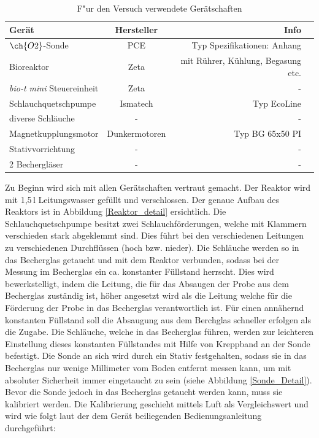 \documentclass[12pt,liststotoc]{report}
\begin{document}
\begin{table}[H]
\caption{F"ur den Versuch verwendete Gerätschaften}
\centering
\begin{tabular}{lcrp{10 cm}}
\toprule 
Gerät&Hersteller&Info\\
\midrule
$\ch{O2}$-Sonde&PCE&Typ Spezifikationen: Anhang\\
Bioreaktor &Zeta&mit Rührer, Kühlung, Begasung etc.\\ 
\textit{bio-t mini} Steuereinheit&Zeta&-\\
Schlauchquetschpumpe&Ismatech&Typ EcoLine\\
diverse Schläuche&-&-\\
Magnetkupplungsmotor&Dunkermotoren&Typ BG 65x50 PI\\
Stativvorrichtung&-&-\\
2 Bechergläser&-&-\\
\bottomrule
\end{tabular}
\label{Geraete}
\end{table}

Zu Beginn wird sich mit allen Gerätschaften vertraut gemacht. Der Reaktor wird mit 1,5\,l Leitungswasser gefüllt und verschlossen. Der genaue Aufbau des Reaktors ist in Abbildung \ref{Reaktor_detail} ersichtlich. Die Schlauchquetschpumpe besitzt zwei Schlauchförderungen, welche mit Klammern verschieden stark abgeklemmt sind. Dies führt bei den verschiedenen Leitungen zu verschiedenen Durchflüssen (hoch bzw. nieder). Die Schläuche werden so in das Becherglas getaucht und mit dem Reaktor verbunden, sodass bei der Messung im Becherglas ein ca. konstanter Füllstand herrscht. Dies wird bewerkstelligt, indem die Leitung, die für das Absaugen der Probe aus dem Becherglas zuständig ist, höher angesetzt wird als die Leitung welche für die Förderung der Probe in das Becherglas verantwortlich ist. Für einen annähernd konstanten Füllstand soll die Absaugung aus dem Berchglas schneller erfolgen als die Zugabe. Die Schläuche, welche in das Becherglas führen, werden zur leichteren Einstellung dieses konstanten Füllstandes mit Hilfe von Kreppband an der Sonde befestigt. Die Sonde an sich wird durch ein Stativ festgehalten, sodass sie in das Becherglas nur wenige Millimeter vom Boden entfernt messen kann, um mit absoluter Sicherheit immer eingetaucht zu sein (siehe Abbildung \ref{Sonde_Detail}). Bevor die Sonde jedoch in das Becherglas getaucht werden kann, muss sie kalibriert werden. Die Kalibrierung geschieht mittels Luft als Vergleichswert und wird wie folgt laut der dem Gerät beiliegenden Bedienungsanleitung durchgeführt:
\end{document}
